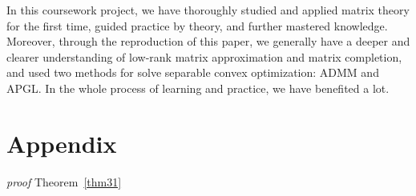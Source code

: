 \documentclass[fontset=windows]{article}
\begin{document}
{In this coursework project, we have thoroughly studied and applied matrix theory for the first time, guided practice by theory, and further mastered knowledge.
Moreover, through the reproduction of this paper, we generally have a deeper and clearer understanding of low-rank matrix approximation and matrix completion, and used two methods for solve separable convex optimization: ADMM and APGL. In the whole process of learning and practice, we have benefited a lot.


\medskip
{\small{}

}{\small\par}




\appendix


\section{Appendix}
\textit{proof} Theorem~\ref{thm31}

}
\end{document}
